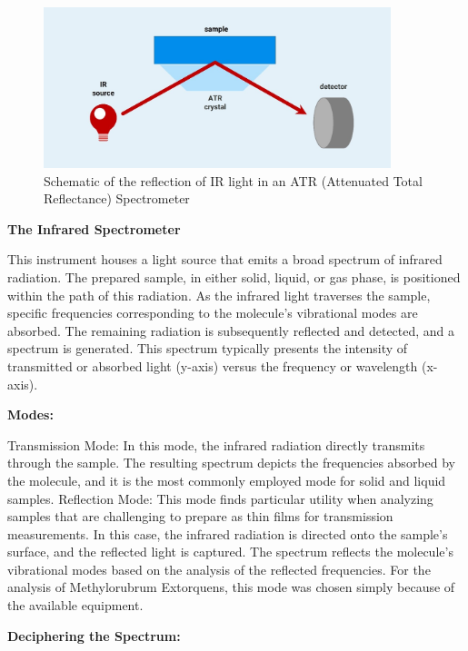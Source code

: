 \begin{figure}[H]
    \centering
    \includegraphics[width=0.9\textwidth]{./media/images/ir_spectrometer}
    \caption{Schematic of the reflection of IR light in an ATR (Attenuated Total Reflectance) Spectrometer}
    \label{fig:ir_spectrometer}
\end{figure}

\textbf{The Infrared Spectrometer}

This instrument houses a light source that emits a broad spectrum of infrared radiation. The
prepared sample, in either solid, liquid, or gas phase, is positioned within the path of this
radiation. As the infrared light traverses the sample, specific frequencies corresponding to the
molecule's vibrational modes are absorbed. The remaining radiation is subsequently reflected
and detected, and a spectrum is generated. This spectrum typically presents the intensity of
transmitted or absorbed light (y-axis) versus the frequency or wavelength (x-axis).

\textbf{Modes:}

Transmission Mode: In this mode, the infrared radiation directly transmits through the
sample. The resulting spectrum depicts the frequencies absorbed by the molecule, and it is
the most commonly employed mode for solid and liquid samples.
Reflection Mode: This mode finds particular utility when analyzing samples that are
challenging to prepare as thin films for transmission measurements. In this case, the infrared
radiation is directed onto the sample's surface, and the reflected light is captured. The
spectrum reflects the molecule's vibrational modes based on the analysis of the reflected
frequencies. For the analysis of Methylorubrum Extorquens, this mode was chosen simply
because of the available equipment.

\textbf{Deciphering the Spectrum:}

